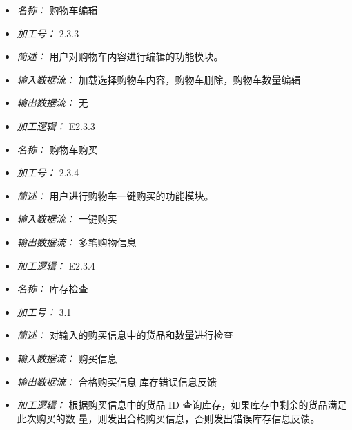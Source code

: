 \vspace{-1mm}


\begin{itemize}
\item \textit{名称： }购物车编辑
\item \textit{加工号： }2.3.3
\item \textit{简述： }用户对购物车内容进行编辑的功能模块。 
\item \textit{输入数据流： }加载选择购物车内容，购物车删除，购物车数量编辑 
\item \textit{输出数据流： }无
\item \textit{加工逻辑： }E2.3.3

\end{itemize}


\vspace{-1mm}


\begin{itemize}
\item \textit{名称： }购物车购买
\item \textit{加工号： }2.3.4 
\item \textit{简述： }用户进行购物车一键购买的功能模块。 
\item \textit{输入数据流： }一键购买 
\item \textit{输出数据流： }多笔购物信息 
\item \textit{加工逻辑： }E2.3.4

\end{itemize}


\vspace{-1mm}


\begin{itemize}
\item \textit{名称： }库存检查
\item \textit{加工号： }3.1
\item \textit{简述： }对输入的购买信息中的货品和数量进行检查
\item \textit{输入数据流： }购买信息
\item \textit{输出数据流： }合格购买信息 库存错误信息反馈
\item \textit{加工逻辑： }根据购买信息中的货品 ID 查询库存，如果库存中剩余的货品满足此次购买的数 量，则发出合格购买信息，否则发出错误库存信息反馈。

\end{itemize}


\vspace{-1mm}


